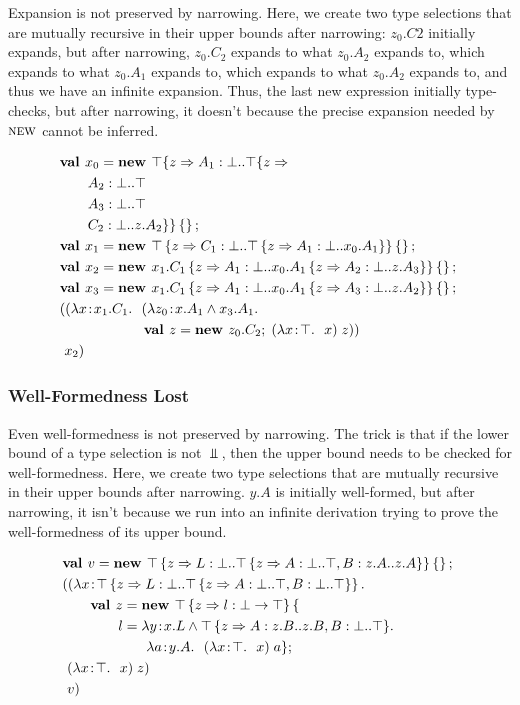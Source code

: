 \documentclass[preprint]{sigplanconf}
\begin{document}
Expansion is not preserved by narrowing. Here, we create two type
selections that are mutually recursive in their upper bounds after
narrowing: $z_0.C2$ initially expands, but after narrowing, $z_0.C_2$
expands to what $z_0.A_2$ expands to, which expands to what $z_0.A_1$
expands to, which expands to what $z_0.A_2$ expands to, and thus we
have an infinite expansion. Thus, the last new expression initially
type-checks, but after narrowing, it doesn't because the precise
expansion needed by $\textsc{new}$ cannot be inferred.

\begin{align*}
&\mlnew {x_0} {\Top \mlrefine z { \Ldecl {A_1} \Bot {\Top \mlrefine z {\\
&\gap\Ldecl {A_2} \Bot \Top\\
&\gap\Ldecl {A_3} \Bot \Top\\
&\gap\Ldecl {C_2} \Bot {z.A_2}}}}\ldefs{}}{
\mlnew {x_1} {\Top \refine z {\Ldecl {C_1} \Bot {\Top \refine z {\Ldecl {A_1} \Bot {x_0.A_1}}}}\ldefs{}}}{
\mlnew {x_2} {{x_1.C_1} \refine z {\Ldecl {A_1} \Bot {{x_0.A_1} \refine z {\Ldecl {A_2} \Bot {z.A_3}}}}\ldefs{}}}{
\mlnew {x_3} {{x_1.C_1} \refine z {\Ldecl {A_1} \Bot {{x_0.A_1} \refine z {\Ldecl {A_3} \Bot {z.A_2}}}}\ldefs{}}}{
\mlapp {\abs x {x_1.C_1} {(\abs {z_0} {x.A_1 \tand x_3.A_1} {\\&\gap\gap\gap\new z {z_0.C_2} {\app {(\abs x \Top x)} z}})}} {\ x_2}}
\end{align*}

\subsubsection{Well-Formedness Lost}\label{narrowing_wf}

Even well-formedness is not preserved by narrowing. The trick is that
if the lower bound of a type selection is not $\Bot$, then the upper
bound needs to be checked for well-formedness. Here, we create two
type selections that are mutually recursive in their upper bounds
after narrowing. $y.A$ is initially well-formed, but after narrowing,
it isn't because we run into an infinite derivation trying to prove
the well-formedness of its upper bound.

\begin{align*}
&\mlnew v {\Top \refine z {\Ldecl L \Bot {\Top \refine z {\Ldecl A \Bot \Top, \Ldecl B {z.A} {z.A}}}} \ldefs{}}{
\mlapp {\abs x {\Top \refine z {\Ldecl L \Bot {\Top \refine z {\Ldecl A \Bot \Top, \Ldecl B \Bot \Top}}}} {\\&\gap
\mlnew z {\Top \refine z {\ldecl l {\Bot \tfun \Top}}\mlldefs{\\&\gap\gap l = \abs y {x.L \tand {\Top \refine z {\Ldecl A {z.B} {z.B}, \Ldecl B \Bot \Top}}} {\\&\gap\gap\gap\abs a {y.A} {\app {(\abs x \Top x)} a}}}}{
\ \app {(\abs x \Top x)} z
}}}{\ v}}
\end{align*}
\end{document}
